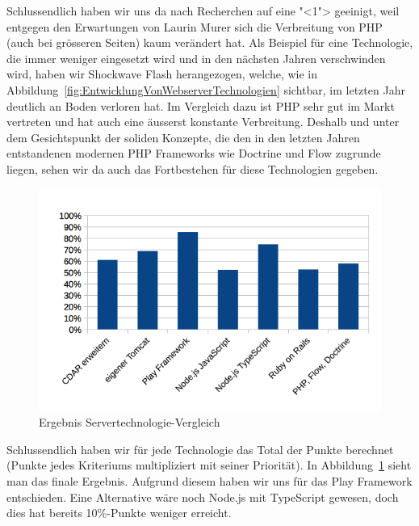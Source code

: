 			Schlussendlich haben wir uns da nach Recherchen auf eine "<1"> geeinigt, weil entgegen den Erwartungen von Laurin Murer sich die Verbreitung von PHP (auch bei grösseren Seiten) kaum verändert hat.
			Als Beispiel für eine Technologie, die immer weniger eingesetzt wird und in den nächsten Jahren verschwinden wird, haben wir Shockwave Flash herangezogen, welche, wie in Abbildung~\ref{fig:EntwicklungVonWebserverTechnologien} sichtbar, im letzten Jahr deutlich an Boden verloren hat.
			Im Vergleich dazu ist PHP sehr gut im Markt vertreten und hat auch eine äusserst konstante Verbreitung.
			Deshalb und unter dem Gesichtspunkt der soliden Konzepte, 
			die den in den letzten Jahren entstandenen modernen PHP Frameworks wie Doctrine und Flow zugrunde liegen, sehen wir da auch das Fortbestehen für diese Technologien gegeben.
			
			\begin{figure}[H]
				\begin{minipage}[b]{\linewidth}
					\includegraphics[width=\textwidth]{media/spreadsheets/ServertechnologieVergleichVergleichDerTechnologienDiagramm.png}
					\centering
					\caption{Ergebnis Servertechnologie-Vergleich}
					\label{fig:ErgebnisServertechnologieVergleich}
				\end{minipage}
			\end{figure}
			
			Schlussendlich haben wir für jede Technologie das Total der Punkte berechnet (Punkte jedes Kriteriums multipliziert mit seiner Priorität).
			In Abbildung~\ref{fig:ErgebnisServertechnologieVergleich} sieht man das finale Ergebnis.
			Aufgrund diesem haben wir uns für das Play Framework entschieden.
			Eine Alternative wäre noch Node.js mit TypeScript gewesen, doch dies hat bereits 10\%-Punkte weniger erreicht.
			
